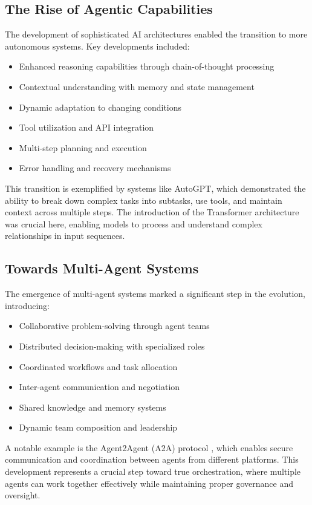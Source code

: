 \documentclass[conference]{IEEEtran}
\begin{document}
\subsection{The Rise of Agentic Capabilities}
The development of sophisticated AI architectures enabled the transition to more autonomous systems. Key developments included:
\begin{itemize}
\item Enhanced reasoning capabilities through chain-of-thought processing
\item Contextual understanding with memory and state management
\item Dynamic adaptation to changing conditions
\item Tool utilization and API integration
\item Multi-step planning and execution
\item Error handling and recovery mechanisms
\end{itemize}

This transition is exemplified by systems like AutoGPT, which demonstrated the ability to break down complex tasks into subtasks, use tools, and maintain context across multiple steps. The introduction of the Transformer architecture \cite{vaswani2017attention} was crucial here, enabling models to process and understand complex relationships in input sequences.

\subsection{Towards Multi-Agent Systems}
The emergence of multi-agent systems marked a significant step in the evolution, introducing:
\begin{itemize}
\item Collaborative problem-solving through agent teams
\item Distributed decision-making with specialized roles
\item Coordinated workflows and task allocation
\item Inter-agent communication and negotiation
\item Shared knowledge and memory systems
\item Dynamic team composition and leadership
\end{itemize}

A notable example is the Agent2Agent (A2A) protocol \cite{google2025a2a}, which enables secure communication and coordination between agents from different platforms. This development represents a crucial step toward true orchestration, where multiple agents can work together effectively while maintaining proper governance and oversight.
\end{document}
